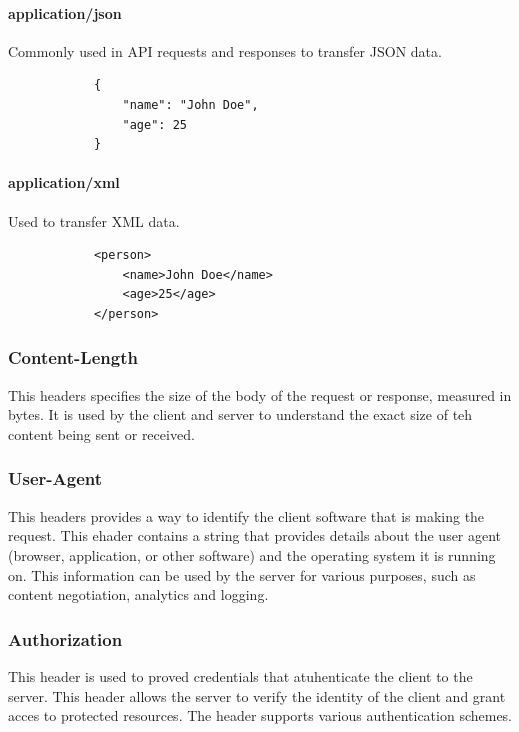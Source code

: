 \documentclass[a4paper]{article}
\begin{document}
        \paragraph{application/json} Commonly used in API requests and responses to transfer JSON data. 

        \begin{verbatim}
            {
                "name": "John Doe",
                "age": 25
            }
        \end{verbatim}


        \paragraph{application/xml} Used to transfer XML data.

        \begin{verbatim}
            <person>
                <name>John Doe</name>
                <age>25</age>
            </person>
        \end{verbatim}



        \subsubsection{Content-Length} This headers specifies the size of the body of the request or response, measured in bytes. It is used by the client and server to understand the exact size of teh content being sent or received.

        \subsubsection{User-Agent} This headers provides a way to identify the client software that is making the request. This ehader contains a string that provides details about the user agent (browser, application, or other software) and the operating system it is running on. This information can be used by the server for various purposes, such as content negotiation, analytics and logging. 

        \subsubsection{Authorization} This header is used to proved credentials that atuhenticate the client to the server. This header allows the server to verify the identity of the client and grant acces to protected resources. The header supports various authentication schemes. 
\end{document}
